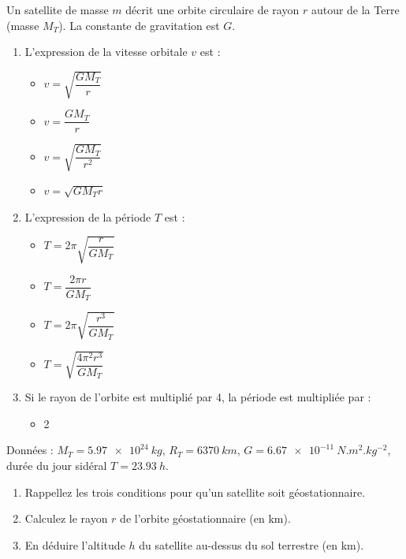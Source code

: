\documentclass[11pt]{article}
\begin{document}
\begin{exercice}
Un satellite de masse $m$ décrit une orbite circulaire de rayon $r$ autour de la Terre (masse $M_T$). La constante de gravitation est $G$.
\begin{enumerate}
    \item L'expression de la vitesse orbitale $v$ est :
    \begin{itemize}
        \item[A.] $v = \sqrt{\dfrac{GM_T}{r}}$
        \item[B.] $v = \dfrac{GM_T}{r}$
        \item[C.] $v = \sqrt{\dfrac{GM_T}{r^2}}$
        \item[D.] $v = \sqrt{G M_T r}$
    \end{itemize}
    \item L'expression de la période $T$ est :
    \begin{itemize}
        \item[A.] $T = 2\pi \sqrt{\dfrac{r}{GM_T}}$
        \item[B.] $T = \dfrac{2\pi r}{GM_T}$
        \item[C.] $T = 2\pi \sqrt{\dfrac{r^3}{GM_T}}$
        \item[D.] $T = \sqrt{\dfrac{4\pi^2 r^3}{GM_T}}$
    \end{itemize}
    \item Si le rayon de l'orbite est multiplié par 4, la période est multipliée par :
    \begin{itemize}
        \item[A.] 2   
    \end{itemize}
\end{enumerate}
\end{exercice}

\begin{exercice}
Données : $M_T = \SI{5,97e24}{kg}$, $R_T = \SI{6370}{km}$, $G = \SI{6,67e-11}{N.m^2.kg^{-2}}$, durée du jour sidéral $T = \SI{23,93}{h}$.
\begin{enumerate}
    \item Rappellez les trois conditions pour qu'un satellite soit géostationnaire.
    \item Calculez le rayon $r$ de l'orbite géostationnaire (en km).
    \item En déduire l'altitude $h$ du satellite au-dessus du sol terrestre (en km).
\end{enumerate}
\end{exercice}
\end{document}
